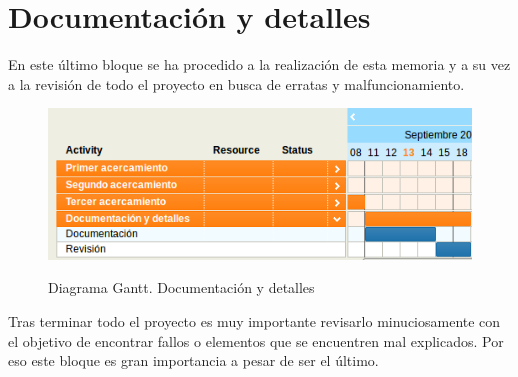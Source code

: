 \section{Documentación y detalles}

En este último bloque se ha procedido a la realización de esta memoria y a su vez a la revisión de todo el proyecto en busca de erratas y malfuncionamiento.\\

\begin{figure}[H] %
\centering
\includegraphics[scale=0.5]{imagenes/gant4.png}  %
\label{gant4.png}
\caption{Diagrama Gantt. Documentación y detalles}
\end{figure}

Tras terminar todo el proyecto es muy importante revisarlo minuciosamente con el objetivo de encontrar fallos o elementos que se encuentren mal explicados. Por eso este bloque es gran importancia a pesar de ser el último.
